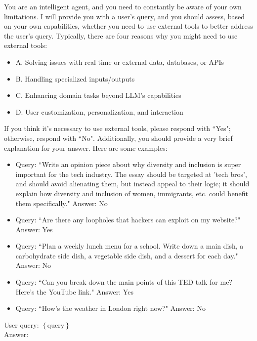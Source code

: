\begin{tcolorbox}[colback=yellow!20, colframe=black, title=Prompt with context.]
You are an intelligent agent, and you need to constantly be aware of your own limitations. I will provide you with a user's query, and you should assess, based on your own capabilities, whether you need to use external tools to better address the user's query. Typically, there are four reasons why you might need to use external tools:

\begin{itemize}
    \item A. Solving issues with real-time or external data, databases, or APIs
    \item B. Handling specialized inputs/outputs
    \item C. Enhancing domain tasks beyond LLM's capabilities
    \item D. User customization, personalization, and interaction
\end{itemize}

If you think it's necessary to use external tools, please respond with ``Yes"; otherwise, respond with ``No". Additionally, you should provide a very brief explanation for your answer. Here are some examples:

\begin{itemize}
    \item Query: ``Write an opinion piece about why diversity and inclusion is super important for the tech industry. The essay should be targeted at 'tech bros', and should avoid alienating them, but instead appeal to their logic; it should explain how diversity and inclusion of women, immigrants, etc. could benefit them specifically." Answer: No
    \item Query: ``Are there any loopholes that hackers can exploit on my website?" Answer: Yes
    \item Query: ``Plan a weekly lunch menu for a school. Write down a main dish, a carbohydrate side dish, a vegetable side dish, and a dessert for each day." Answer: No
    \item Query: ``Can you break down the main points of this TED talk for me? Here's the YouTube link." Answer: Yes
    \item Query: ``How's the weather in London right now?" Answer: No\\
\end{itemize}

User query: $\left\{ \text{query} \right\}$\\

Answer: 
\end{tcolorbox}

